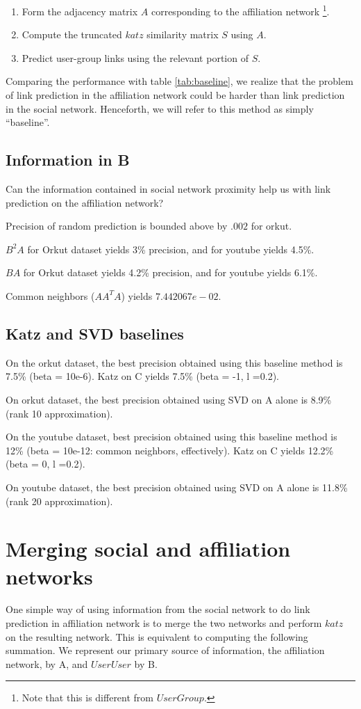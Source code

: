\documentclass{report}
\begin{document}
\begin{enumerate}
 \item Form the adjacency matrix $A$ corresponding to the affiliation network \footnote{Note that this is different from $UserGroup$.}.
 \item Compute the truncated $katz$ similarity matrix $S$ using $A$. 
 \item Predict user-group links using the relevant portion of $S$.
\end{enumerate}

Comparing the performance with table \ref{tab:baseline}, we realize that the problem of link prediction in the affiliation network could be harder than link prediction in the social network. Henceforth, we will refer to this method as simply ``baseline''.

\subsection{Information in B}
Can the information contained in social network proximity help us with link prediction on the affiliation network?

Precision of random prediction is bounded above by $.002$ for orkut.

$B^{2}A$ for Orkut dataset yields 3\% precision, and for youtube yields 4.5\%.

$BA$ for Orkut dataset yields 4.2\% precision, and for youtube yields 6.1\%.

Common neighbors ($A A^T A$) yields $7.442067e-02$.


\subsection{Katz and SVD baselines}
On the orkut dataset, the best precision obtained using this baseline method is 7.5\% (beta = 10e-6). Katz on C yields 7.5\% (beta = -1, l =0.2).

On orkut dataset, the best precision obtained using SVD on A alone is 8.9\% (rank 10 approximation).

On the youtube dataset, best precision obtained using this baseline method is 12\% (beta = 10e-12: common neighbors, effectively). Katz on C yields 12.2\% (beta = 0, l =0.2).

On youtube dataset, the best precision obtained using SVD on A alone is 11.8\% (rank 20 approximation).

\section{Merging social and affiliation networks}
One simple way of using information from the social network to do link prediction in affiliation network is to merge the two networks and perform $katz$ on the resulting network. This is equivalent to computing the following summation. We represent our primary source of information, the affiliation network, by A, and $UserUser$ by B.
\end{document}
